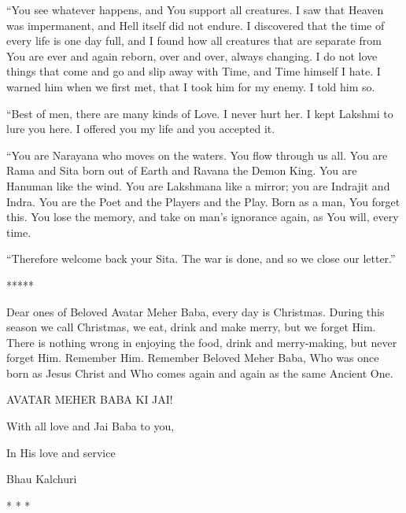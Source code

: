 ``You see whatever happens, and You support all creatures. I saw that Heaven was impermanent, and Hell itself did not endure. I discovered that the time of every life is one day full, and I found how all creatures that are separate from You are ever and again reborn, over and over, always changing. I do not love things that come and go and slip away with Time, and Time himself I hate. I warned him when we first met, that I took him for my enemy. I told him so.

``Best of men, there are many kinds of Love. I never hurt her. I kept Lakshmi to lure you here. I offered you my life and you accepted it.

``You are Narayana who moves on the waters. You flow through us all. You are Rama and Sita born out of Earth and Ravana the Demon King. You are Hanuman like the wind. You are Lakshmana like a mirror; you are Indrajit and Indra. You are the Poet and the Players and the Play. Born as a man, You forget this. You lose the memory, and take on man's ignorance again, as You will, every time.

``Therefore welcome back your Sita. The war is done, and so we close our letter.''

\begin{center} ***** \end{center}

Dear ones of Beloved Avatar Meher Baba, every day is Christmas. During this season we call Christmas, we eat, drink and make merry, but we forget Him. There is nothing wrong in enjoying the food, drink and merry-making, but never forget Him. Remember Him. Remember Beloved Meher Baba, Who was once born as Jesus Christ and Who comes again and again as the same Ancient One.

AVATAR MEHER BABA KI JAI!

With all love and Jai Baba to you,

In His love and service

Bhau Kalchuri



\begin{center}* * *\end{center}

